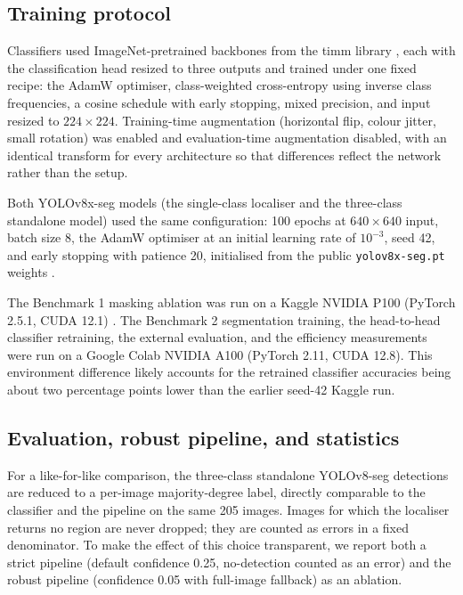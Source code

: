 \documentclass{elektr}
\begin{document}
\subsection{Training protocol}
\label{Mat:train}
Classifiers used ImageNet-pretrained backbones \cite{imagenet} from the timm library \cite{timm}, each with the classification head resized to three outputs and trained under one fixed recipe: the AdamW optimiser, class-weighted cross-entropy using inverse class frequencies, a cosine schedule with early stopping, mixed precision, and input resized to $224\times224$. Training-time augmentation (horizontal flip, colour jitter, small rotation) was enabled and evaluation-time augmentation disabled, with an identical transform for every architecture so that differences reflect the network rather than the setup.

Both YOLOv8x-seg models (the single-class localiser and the three-class standalone model) used the same configuration: 100 epochs at $640\times640$ input, batch size 8, the AdamW optimiser at an initial learning rate of $10^{-3}$, seed 42, and early stopping with patience 20, initialised from the public \texttt{yolov8x-seg.pt} weights \cite{ultralytics}.

The Benchmark 1 masking ablation was run on a Kaggle NVIDIA P100 (PyTorch 2.5.1, CUDA 12.1) \cite{pytorch}. The Benchmark 2 segmentation training, the head-to-head classifier retraining, the external evaluation, and the efficiency measurements were run on a Google Colab NVIDIA A100 (PyTorch 2.11, CUDA 12.8). This environment difference likely accounts for the retrained classifier accuracies being about two percentage points lower than the earlier seed-42 Kaggle run.

\subsection{Evaluation, robust pipeline, and statistics}
\label{Mat:eval}
For a like-for-like comparison, the three-class standalone YOLOv8-seg detections are reduced to a per-image majority-degree label, directly comparable to the classifier and the pipeline on the same 205 images. Images for which the localiser returns no region are never dropped; they are counted as errors in a fixed denominator. To make the effect of this choice transparent, we report both a strict pipeline (default confidence 0.25, no-detection counted as an error) and the robust pipeline (confidence 0.05 with full-image fallback) as an ablation.
\end{document}
